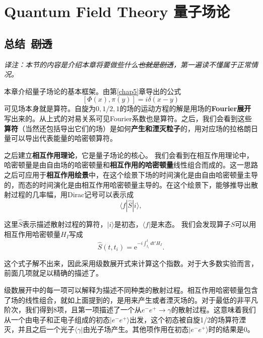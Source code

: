 


\chapter[量子场论]{Quantum Field Theory \quad 量子场论}
\label{chap9}

\section*{总结\, \sout{剧透}}
{\it 译注：本节的内容是介绍本章将要做些什么\sout{也就是剧透}，第一遍读不懂属于正常情况。}

本章介绍量子场论的基本框架。由第\ref{chap5}章导出的公式
$$ [\Phi(x), \pi(y)] = i \delta(x - y) $$
可见场本身就是算符。自旋为$0, 1/2, 1$的场的运动方程的解是用场的{\bf Fourier展开}写出来的。从上式的对易关系可见Fourier系数也是算符。之后，我们会看到这些{\bf 算符}（当然还包括导出它们的场）是如何{\bf 产生和湮灭粒子}的，用对应场的拉格朗日量可以导出代表能量的哈密顿算符。

之后建立{\bf 相互作用理论}，它是量子场论的核心。 我们会看到在相互作用理论中，哈密顿量是由自由场的哈密顿量和{\bf 相互作用的哈密顿量}线性组合而成的。这一思路之后可应用于{\bf 相互作用绘景}中，在这个绘景下场的时间演化是由自由哈密顿量主导的，而态的时间演化是由相互作用哈密顿量主导的。在这个绘景下，能够推导出散射过程的几率幅，用Dirac记号可以表示成
$$\langle f | \hat{S} | i\rangle,$$

这里$\hat{S}$表示描述散射过程的算符，$|i\rangle$是初态，$\langle f|$是末态。 我们会发现算子$\hat{S}$可以用相互作用哈密顿量$H_{I}$写成
$$\hat{S}(t,t_{i}) = \mathrm{e}^{-i\int_{t_{i}}^{t} dt' H_{I}}.$$

这个式子解不出来，因此采用级数展开式来计算这个指数。对于大多数实验而言，前面几项就足以精确的描述了。

级数展开中的每一项可以解释为描述不同种类的散射过程。相互作用哈密顿量包含了场的线性组合，就如上面提到的，是用来产生或者湮灭场的。对于最低的非平凡阶次，我们得到8项，且第一项描述了一个从$e^{-} e^{+} \to \gamma$的散射过程。这意味着我们从一个由电子和正电子组成的初态$|e^{-}e^{+} \rangle$出发，这个初态被自旋1/2的场算符湮灭，并且之后一个光子$\langle \gamma |$由光子场产生。其他项作用在初态$|e^{-}e^{+} \rangle$时的结果是0。

